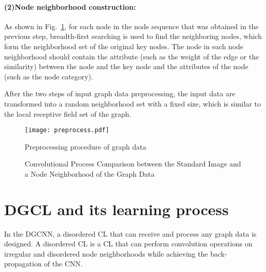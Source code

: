 \documentclass[11pt]{article}
\begin{document}
\paragraph{(2)Node neighborhood construction:} As shown in Fig.~\ref{fig:Preprocessing}, for each node in the node sequence that was obtained in the previous step, breadth-first searching is used to find the neighboring nodes, which form the neighborhood set of the original key nodes. The node in each node neighborhood should contain the attribute (such as the weight of the edge or the similarity) between the node and the key node and the attributes of the node (such as the node category).

After the two steps of input graph data preprocessing, the input data are transformed into a random neighborhood set with a fixed size, which is similar to the local receptive field set of the graph.

\begin{figure}
\vspace{-0.1in}
\centering
\texttt{[image: preprocess.pdf]}
\vspace{-0.1in}
\caption{Preprocessing procedure of graph data}\label{fig:Preprocessing}
\vspace{-0.2in}
\end{figure}


\begin{figure*}[!htbp]
\centering
{}
\caption{Convolutional Process Comparison between the Standard Image and a Node Neighborhood of the Graph Data}\label{fig:DGCNNsandCNN}
\end{figure*}





\section{DGCL and its learning process}
In the DGCNN, a disordered CL that can receive and process any graph data is designed. A disordered CL is a CL that can perform convolution operations on irregular and disordered node neighborhoods while achieving the back-propagation of the CNN.
\end{document}

